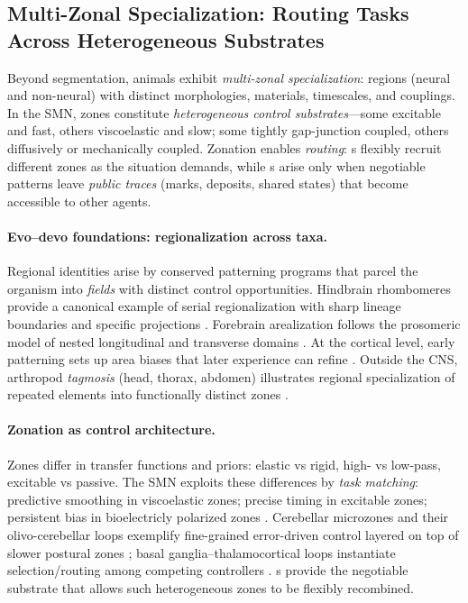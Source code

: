 
\subsection{Multi-Zonal Specialization: Routing Tasks Across Heterogeneous Substrates}
\label{subsec:multizonal}

Beyond segmentation, animals exhibit \emph{multi-zonal specialization}: regions (neural and non-neural) with distinct morphologies, materials, timescales, and couplings.
In the SMN, zones constitute \emph{heterogeneous control substrates}---some excitable and fast, others viscoelastic and slow; some tightly gap-junction coupled, others diffusively or mechanically coupled.
Zonation enables \emph{routing}: \NAP{}s flexibly recruit different zones as the situation demands, while \TAP{}s arise only when negotiable patterns leave \emph{public traces} (marks, deposits, shared states) that become accessible to other agents.

\paragraph{Evo--devo foundations: regionalization across taxa.}
Regional identities arise by conserved patterning programs that parcel the organism into \emph{fields} with distinct control opportunities.
Hindbrain rhombomeres provide a canonical example of serial regionalization with sharp lineage boundaries and specific projections \cite{LumsdenKrumlauf1996Hindbrain}.
Forebrain arealization follows the prosomeric model of nested longitudinal and transverse domains \cite{PuellesRubenstein2003Prosomeric}.
At the cortical level, early patterning sets up area biases that later experience can refine \cite{SurRubenstein2005CortexPatternPlasticity}.
Outside the CNS, arthropod \emph{tagmosis} (head, thorax, abdomen) illustrates regional specialization of repeated elements into functionally distinct zones \cite{Scholtz2010Tagmosis}.

\paragraph{Zonation as control architecture.}
Zones differ in transfer functions and priors: elastic vs rigid, high- vs low-pass, excitable vs passive.
The SMN exploits these differences by \emph{task matching}: predictive smoothing in viscoelastic zones; precise timing in excitable zones; persistent bias in bioelectricly polarized zones \cite{Levin2014MolecularBioelectricity}.
Cerebellar microzones and their olivo-cerebellar loops exemplify fine-grained error-driven control layered on top of slower postural zones \cite{AppsHawkes2009CerebellarZones}; basal ganglia–thalamocortical loops instantiate selection/routing among competing controllers \cite{AlexanderDeLongStrick1986ParallelLoops}.
\NAP{}s provide the negotiable substrate that allows such heterogeneous zones to be flexibly recombined.

